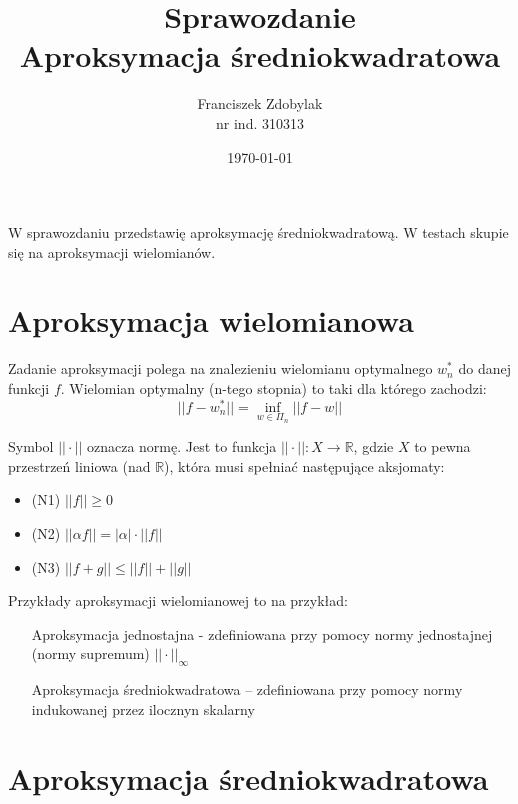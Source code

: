 \documentclass[a4paper]{article}
\author{Franciszek Zdobylak \\ \small{nr ind. 310313}}
\title{\LARGE{Sprawozdanie} \\ \normalsize{Aproksymacja średniokwadratowa}}
\date{\today}
\theoremstyle{definition}
\theoremstyle{theorem}
\begin{document}
\maketitle
\abstract
W sprawozdaniu przedstawię aproksymację średniokwadratową. W testach skupie się 
na aproksymacji wielomianów.

\section{Aproksymacja wielomianowa}

Zadanie aproksymacji polega na znalezieniu wielomianu optymalnego $w^*_n$ do danej
funkcji $f$. Wielomian optymalny (n-tego stopnia) to taki dla którego zachodzi:
$$ ||f - w^*_n|| = \inf_{w\in\Pi_n}||f - w||$$

Symbol $||\cdot||$ oznacza normę. Jest to funkcja $||\cdot||: X \rightarrow 
\mathbb{R}$, gdzie $X$ to pewna przestrzeń liniowa (nad $\mathbb R$), 
która musi spełniać następujące aksjomaty: 
\begin{center}
\begin{minipage}{0.5\textwidth}
\begin {itemize}
\item[(N1)] $ ||f|| \ge 0$
\item[(N2)] $ ||\alpha f|| = |\alpha|\cdot||f|| $
\item[(N3)] $ ||f+g|| \le ||f|| + ||g|| $
\end{itemize}
\end{minipage}
\end{center}

Przykłady aproksymacji wielomianowej to na przykład: 
\begin{itemize}
  \item[] Aproksymacja jednostajna - zdefiniowana przy pomocy normy jednostajnej
    (normy supremum) $||\cdot||_{\infty}$
  \item[] Aproksymacja średniokwadratowa -- zdefiniowana przy pomocy normy 
    indukowanej przez ilocznyn skalarny
\end{itemize}

\section{Aproksymacja średniokwadratowa}
\end{document}
